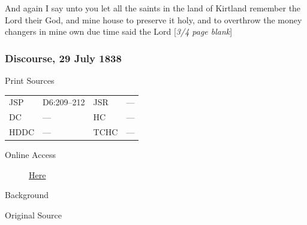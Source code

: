 					And again I say unto you let all the saints in the land of Kirtland remember the Lord their God, and mine house to preserve it holy, and to overthrow the money changers in mine own due time said the Lord [\textit{3/4 page blank}]
					
		\subsubsection{Discourse, 29 July 1838}
			\label{EMS-1838-JS-29-JUL-1838}
			
			\begin{description}
					\item[Print Sources]
				\end{description}

					\begin{tabular}{p{0.5in}p{1in}p{0.5in}p{1in}}
					JSP	 	& D6:209--212		& JSR 		& --- \\
					DC	 	& ---		& HC 		& --- \\
					HDDC 	& ---		& TCHC 		& --- \\
					\end{tabular}
				
				\begin{description}
					\item[Online Access] \href{https://www.josephsmithpapers.org/paper-summary/discourse-29-july-1838/1}{Here}
				\end{description}
				
				\begin{description}
					\item[Background]
				\end{description}
				
				
				\begin{description}
					\item[Original Source]
				\end{description}
				
				
